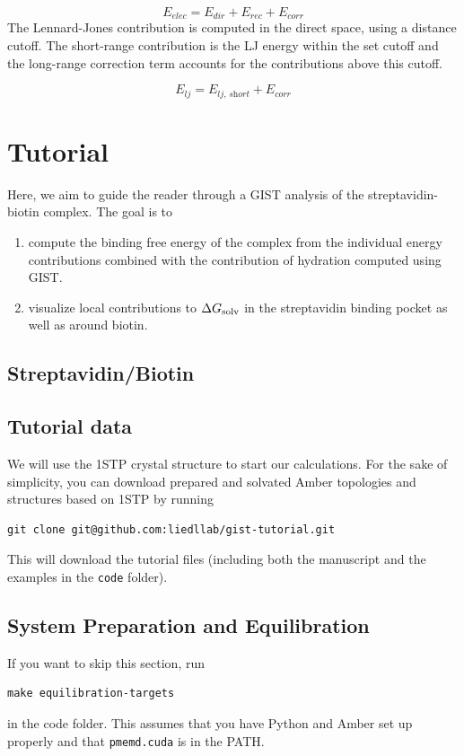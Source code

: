 \documentclass[9pt,tutorial]{livecoms}
\newcommand{\dgsolv}{\Delta G_\textup{solv}}
\newcommand{\software}{\texttt}
\newcommand{\todo}{\textcolor{red}}
\begin{document}
\begin{equation}
	E_\textit{elec} = E_\textit{dir} + E_\textit{rec} + E_\textit{corr}
\end{equation}
The Lennard-Jones contribution is computed in the direct space, using a distance cutoff. The short-range contribution is the LJ energy within the set cutoff and the long-range correction term accounts for the contributions above this cutoff.

\begin{equation}
	E_\textit{lj} = E_\textit{lj,\ short} +  E_\textit{corr}
\end{equation}

\section{Tutorial}
Here, we aim to guide the reader through a GIST analysis of the streptavidin-biotin complex. The goal is to
\begin{enumerate}
	\item compute the binding free energy of the complex from the individual energy contributions combined with the contribution of hydration computed using GIST.
	\item visualize local contributions to $\dgsolv$ in the streptavidin binding pocket as well as around biotin.
\end{enumerate}

\subsection{Streptavidin/Biotin}
\subsection{Tutorial data}
We will use the 1STP crystal structure to start our calculations.
For the sake of simplicity, you can download prepared and solvated Amber topologies and structures based on 1STP by running
\begin{lstlisting}
git clone git@github.com:liedllab/gist-tutorial.git
\end{lstlisting}
This will download the tutorial files (including both the manuscript and the examples in the \software{code} folder).
\subsection{System Preparation and Equilibration}
If you want to skip this section, run 
\begin{lstlisting}
make equilibration-targets
\end{lstlisting}
in the code folder. This assumes that you have Python and Amber set up properly and that \software{pmemd.cuda} is in the PATH.
\end{document}
